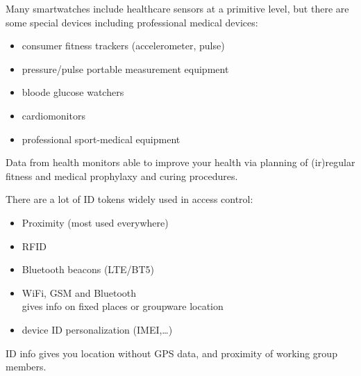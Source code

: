 \secdown



\clearpage{}

\noindent
Many smartwatches include healthcare sensors at a primitive level, but there are
some special devices including professional medical devices:
\begin{itemize}[nosep]
  \item consumer fitness trackers (accelerometer, pulse)
  \item pressure/pulse portable measurement equipment
  \item bloode glucose watchers
  \item cardiomonitors
  \item professional sport-medical equipment
\end{itemize}
\medskip\noindent
Data from health monitors able to improve your health via planning of
(ir)regular fitness and medical prophylaxy and curing procedures.


\noindent
There are a lot of ID tokens widely used in access control:
\begin{itemize}[nosep]
  \item Proximity (most used everywhere)
  \item RFID
  \item Bluetooth beacons (LTE/BT5)
  \item WiFi, GSM and Bluetooth \\
  gives info on fixed places or groupware location
  \item device ID personalization (IMEI,\ldots)
\end{itemize}
\medskip\noindent
ID info gives you location without GPS data, and proximity of working group
members.

\secup

